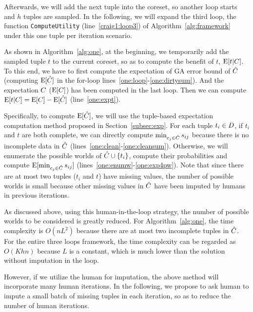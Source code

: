 Afterwards, we will add the next tuple into the coreset, so another loop starts and $h$ tuples are sampled. In the following, we will expand the third loop,   \ie the function \texttt{ComputeUtility} (line~\ref{craig1:loop3})  of Algorithm~\ref{alg:framework} under this one tuple per iteration scenario. 




As shown in Algorithm~\ref{alg:one}, at the beginning, we temporarily add the sampled tuple $t$ to the current coreset, so as to compute the benefit of $t$, \ie  $\mathrm{E}[t|C]$. To this end, we have to first  compute the expectation  of GA error bound of $\hat{C}$   (\ie computing $\mathrm{E}[\hat{C}]$ in the for-loop lines~\ref{one:loop}-\ref{one:dirtysum}). And the expectation \wrt $C$ (\ie $\mathrm{E}[C]$) has been computed in the last loop. Then we can compute $\mathrm{E}[t|C] = \mathrm{E}[C] - \mathrm{E}[\hat{C}]$ (line~\ref{one:expt}).


Specifically, to compute $\mathrm{E}[\hat{C}]$, we will use the tuple-based expectation computation method proposed in Section~\ref{subsec:exp}. For each tuple $t_i\in D$, if $t_i$ and $t$ are both complete, we can directly compute $\min_{c_j\in \hat{C}}s_{ij}$ because there is no incomplete data in $\hat{C}$ (lines~\ref{one:clean}-\ref{one:cleansum}). Otherwise, we will enumerate the possible worlds of $\hat{C} \cup \{t_i\}$, compute their probabilities and compute $\mathrm{E}[\min_{c_j\in \hat{C}}s_{ij}]$
 (lines~\ref{one:enumw}-\ref{one:exp4pw}).
  Note that since there are at most two tuples (\ie $t_i$ and $t$) have missing values, the number of possible worlds is small because other missing values in $\hat{C}$ have been imputed by humans in previous iterations.

 As discussed above, using this human-in-the-loop strategy, the number of possible worlds to be considered is greatly reduced. For   Algorithm~\ref{alg:one}, the time complexity is $O(nL^2)$ because there are at most two incomplete tuples in $\hat{C}$. For the entire three loops framework, the time complexity can be regarded as   $O(Khn)$ because $L$ is a constant, which is much lower  than the solution without imputation in the loop.
  
  However,  if we utilize the human for imputation, the above method  will incorporate many human iterations. In the following,  we propose to ask human to impute a small batch of missing tuples in each iteration, so as to reduce the  number of human iterations.
  

